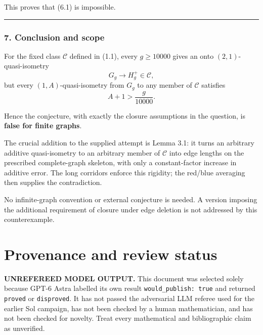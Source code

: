 \documentclass[
  11pt,
  a4paper,
]{article}
\begin{document}
This proves that (6.1) is impossible.

\begin{center}\rule{0.5\linewidth}{0.5pt}\end{center}

\subsubsection{7. Conclusion and scope}\label{conclusion-and-scope}

For the fixed class \(\mathcal C\) defined in (1.1), every \(g\ge10000\)
gives an onto \((2,1)\)-quasi-isometry \[
G_g\to H_g^+\in\mathcal C,
\] but every \((1,A)\)-quasi-isometry from \(G_g\) to any member of
\(\mathcal C\) satisfies \[
A+1>\frac g{10000}.
\]

Hence the conjecture, with exactly the closure assumptions in the
question, is \textbf{false for finite graphs}.

The crucial addition to the supplied attempt is Lemma 3.1: it turns an
arbitrary additive quasi-isometry to an arbitrary member of
\(\mathcal C\) into edge lengths on the prescribed complete-graph
skeleton, with only a constant-factor increase in additive error. The
long corridors enforce this rigidity; the red/blue averaging then
supplies the contradiction.

No infinite-graph convention or external conjecture is needed. A version
imposing the additional requirement of closure under edge deletion is
not addressed by this counterexample.

\appendix

\section{Provenance and review
status}\label{provenance-and-review-status}

\begin{warning}

\textbf{UNREFEREED MODEL OUTPUT.} This document was selected solely
because GPT-6 Astra labelled its own result
\texttt{would\_publish:\ true} and returned \texttt{proved} or
\texttt{disproved}. It has not passed the adversarial LLM referee used
for the earlier Sol campaign, has not been checked by a human
mathematician, and has not been checked for novelty. Treat every
mathematical and bibliographic claim as unverified.

\end{warning}
\end{document}

